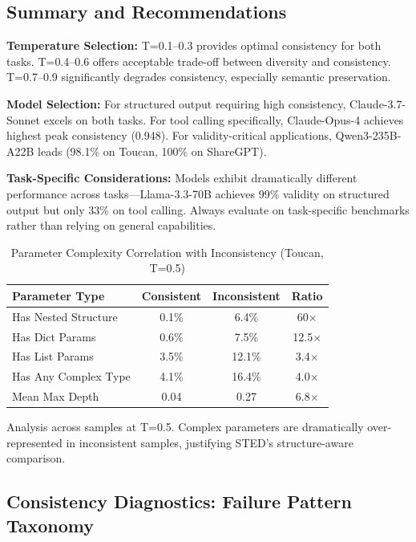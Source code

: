 \documentclass{article}
\theoremstyle{plain}
\theoremstyle{definition}
\begin{document}
\subsection{Summary and Recommendations}

\textbf{Temperature Selection:} T=0.1--0.3 provides optimal consistency for both tasks. T=0.4--0.6 offers acceptable trade-off between diversity and consistency. T=0.7--0.9 significantly degrades consistency, especially semantic preservation.

\textbf{Model Selection:} For structured output requiring high consistency, Claude-3.7-Sonnet excels on both tasks. For tool calling specifically, Claude-Opus-4 achieves highest peak consistency (0.948). For validity-critical applications, Qwen3-235B-A22B leads (98.1\% on Toucan, 100\% on ShareGPT).

\textbf{Task-Specific Considerations:} Models exhibit dramatically different performance across tasks---Llama-3.3-70B achieves 99\% validity on structured output but only 33\% on tool calling. Always evaluate on task-specific benchmarks rather than relying on general capabilities.

\begin{table}[h]
\centering
\caption{Parameter Complexity Correlation with Inconsistency (Toucan, T=0.5)}
\label{tab:complexity-correlation}
\scriptsize
\begin{tabular}{@{}lccc@{}}
\toprule
\textbf{Parameter Type} & \textbf{Consistent} & \textbf{Inconsistent} & \textbf{Ratio} \\
\midrule
Has Nested Structure & 0.1\% & 6.4\% & 60$\times$ \\
Has Dict Params & 0.6\% & 7.5\% & 12.5$\times$ \\
Has List Params & 3.5\% & 12.1\% & 3.4$\times$ \\
Has Any Complex Type & 4.1\% & 16.4\% & 4.0$\times$ \\
\midrule
Mean Max Depth & 0.04 & 0.27 & 6.8$\times$ \\
\bottomrule
\end{tabular}

\vspace{0.5em}
\raggedright\small Analysis across samples at T=0.5. Complex parameters are dramatically over-represented in inconsistent samples, justifying STED's structure-aware comparison.
\end{table}

\subsection{Consistency Diagnostics: Failure Pattern Taxonomy}
\label{sec:sted-value-analysis}
\end{document}
